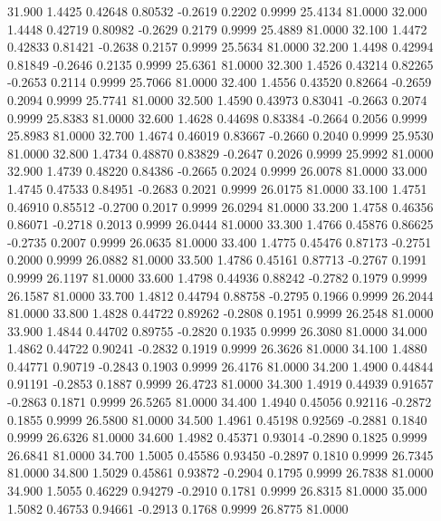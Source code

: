   31.900   1.4425   0.42648   0.80532  -0.2619   0.2202   0.9999  25.4134  81.0000
  32.000   1.4448   0.42719   0.80982  -0.2629   0.2179   0.9999  25.4889  81.0000
  32.100   1.4472   0.42833   0.81421  -0.2638   0.2157   0.9999  25.5634  81.0000
  32.200   1.4498   0.42994   0.81849  -0.2646   0.2135   0.9999  25.6361  81.0000
  32.300   1.4526   0.43214   0.82265  -0.2653   0.2114   0.9999  25.7066  81.0000
  32.400   1.4556   0.43520   0.82664  -0.2659   0.2094   0.9999  25.7741  81.0000
  32.500   1.4590   0.43973   0.83041  -0.2663   0.2074   0.9999  25.8383  81.0000
  32.600   1.4628   0.44698   0.83384  -0.2664   0.2056   0.9999  25.8983  81.0000
  32.700   1.4674   0.46019   0.83667  -0.2660   0.2040   0.9999  25.9530  81.0000
  32.800   1.4734   0.48870   0.83829  -0.2647   0.2026   0.9999  25.9992  81.0000
  32.900   1.4739   0.48220   0.84386  -0.2665   0.2024   0.9999  26.0078  81.0000
  33.000   1.4745   0.47533   0.84951  -0.2683   0.2021   0.9999  26.0175  81.0000
  33.100   1.4751   0.46910   0.85512  -0.2700   0.2017   0.9999  26.0294  81.0000
  33.200   1.4758   0.46356   0.86071  -0.2718   0.2013   0.9999  26.0444  81.0000
  33.300   1.4766   0.45876   0.86625  -0.2735   0.2007   0.9999  26.0635  81.0000
  33.400   1.4775   0.45476   0.87173  -0.2751   0.2000   0.9999  26.0882  81.0000
  33.500   1.4786   0.45161   0.87713  -0.2767   0.1991   0.9999  26.1197  81.0000
  33.600   1.4798   0.44936   0.88242  -0.2782   0.1979   0.9999  26.1587  81.0000
  33.700   1.4812   0.44794   0.88758  -0.2795   0.1966   0.9999  26.2044  81.0000
  33.800   1.4828   0.44722   0.89262  -0.2808   0.1951   0.9999  26.2548  81.0000
  33.900   1.4844   0.44702   0.89755  -0.2820   0.1935   0.9999  26.3080  81.0000
  34.000   1.4862   0.44722   0.90241  -0.2832   0.1919   0.9999  26.3626  81.0000
  34.100   1.4880   0.44771   0.90719  -0.2843   0.1903   0.9999  26.4176  81.0000
  34.200   1.4900   0.44844   0.91191  -0.2853   0.1887   0.9999  26.4723  81.0000
  34.300   1.4919   0.44939   0.91657  -0.2863   0.1871   0.9999  26.5265  81.0000
  34.400   1.4940   0.45056   0.92116  -0.2872   0.1855   0.9999  26.5800  81.0000
  34.500   1.4961   0.45198   0.92569  -0.2881   0.1840   0.9999  26.6326  81.0000
  34.600   1.4982   0.45371   0.93014  -0.2890   0.1825   0.9999  26.6841  81.0000
  34.700   1.5005   0.45586   0.93450  -0.2897   0.1810   0.9999  26.7345  81.0000
  34.800   1.5029   0.45861   0.93872  -0.2904   0.1795   0.9999  26.7838  81.0000
  34.900   1.5055   0.46229   0.94279  -0.2910   0.1781   0.9999  26.8315  81.0000
  35.000   1.5082   0.46753   0.94661  -0.2913   0.1768   0.9999  26.8775  81.0000
